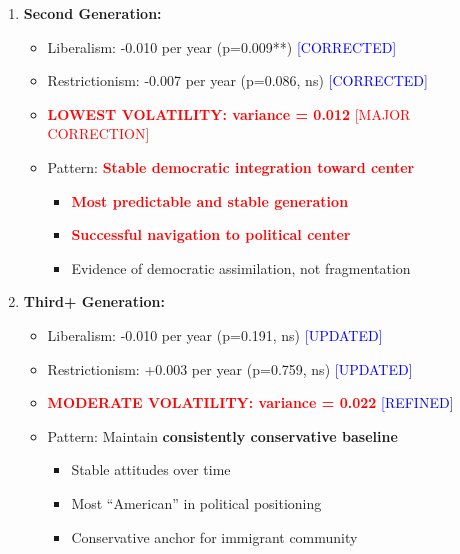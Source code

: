 \begin{enumerate}
    \item \textbf{Second Generation:}
        \begin{itemize}
            \item Liberalism: -0.010 per year (p=0.009**) \textcolor{blue}{[CORRECTED]}
            \item Restrictionism: -0.007 per year (p=0.086, ns) \textcolor{blue}{[CORRECTED]}
            \item \textcolor{red}{\textbf{LOWEST VOLATILITY: variance = 0.012}} \textcolor{red}{[MAJOR CORRECTION]}
            \item Pattern: \textbf{\textcolor{red}{Stable democratic integration toward center}}
                \begin{itemize}
                    \item \textcolor{red}{\textbf{Most predictable and stable generation}}
                    \item \textcolor{red}{\textbf{Successful navigation to political center}}
                    \item Evidence of democratic assimilation, not fragmentation
                \end{itemize}
        \end{itemize}

    \item \textbf{Third+ Generation:}
        \begin{itemize}
            \item Liberalism: -0.010 per year (p=0.191, ns) \textcolor{blue}{[UPDATED]}
            \item Restrictionism: +0.003 per year (p=0.759, ns) \textcolor{blue}{[UPDATED]}
            \item \textcolor{red}{\textbf{MODERATE VOLATILITY: variance = 0.022}} \textcolor{blue}{[REFINED]}
            \item Pattern: Maintain \textbf{consistently conservative baseline}
                \begin{itemize}
                    \item Stable attitudes over time
                    \item Most ``American'' in political positioning
                    \item Conservative anchor for immigrant community
                \end{itemize}
        \end{itemize}
\end{enumerate}

